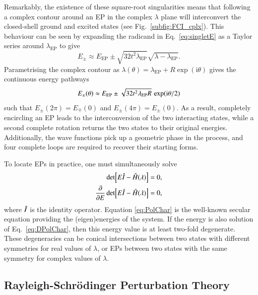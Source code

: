 \documentclass[aps,prb,reprint,noshowkeys,linenumbers,superscriptaddress]{revtex4-1}
\newcommand{\hugh}[1]{\textcolor{hughgreen}{#1}}
\newcommand{\hI}{\Hat{I}}
\newcommand{\hH}{\Hat{H}}
\renewcommand{\i}{\mathrm{i}} %
\begin{document}
Remarkably, the existence of these square-root singularities means that following a complex contour around an EP in the complex $\lambda$ plane will interconvert the closed-shell ground and excited states (see Fig.~\ref{subfig:FCI_cplx}).
This behaviour can be seen by expanding the radicand in Eq.~\eqref{eq:singletE} as a Taylor series around $\lambda_{\text{EP}}$ to give
\begin{equation}
E_{\pm} \approx E_{\text{EP}} \pm \sqrt{32t^2 \lambda_{\text{EP}}} \sqrt{\lambda - \lambda_{\text{EP}}}.
\end{equation}
Parametrising the complex contour as $\lambda(\theta) = \lambda_{\text{EP}} + R \exp(\i \theta)$ gives the continuous energy pathways 
\begin{equation}
E_{\pm} \qty(\theta) \approx E_{\text{EP}} \pm \sqrt{32t^2 \lambda_{\text{EP}} R}\, \exp(\i \theta/2)
\end{equation}
such that $E_{\pm}(2\pi)  = E_{\mp}(0)$ and $E_{\pm}(4\pi)  = E_{\pm}(0)$.
As a result, completely encircling an EP leads to the interconversion of the two interacting states, while a second complete rotation returns the two states to their original energies.
Additionally, the wave functions pick up a geometric phase in the process, and four complete loops are required to recover their starting forms.\cite{MoiseyevBook}

\hugh{To locate EPs in practice, one must simultaneously solve
\begin{subequations}
\begin{align}
	\label{eq:PolChar}
	\det[E\hI-\hH(\lambda)] & = 0,
	\\ 
	\label{eq:DPolChar}
	\pdv{E}\det[E\hI-\hH(\lambda)] & = 0,
\end{align}
\end{subequations}
where $\hI$ is the identity operator.\cite{Cejnar_2007}
Equation \eqref{eq:PolChar} is the well-known secular equation providing the (eigen)energies of the system. 
If the energy is also solution of Eq.~\eqref{eq:DPolChar}, then this energy value is at least two-fold degenerate. 
These degeneracies can be conical intersections between two states with different symmetries 
for real values of $\lambda$,\cite{Yarkony_1996} or EPs between two states with the 
same symmetry for complex values of $\lambda$.}


\subsection{Rayleigh-Schr\"odinger Perturbation Theory}
\end{document}
